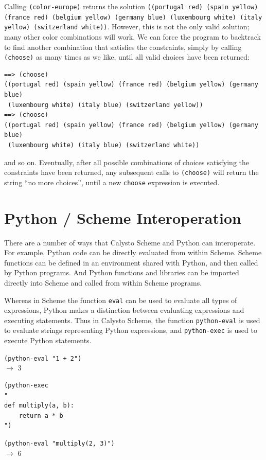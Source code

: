 \documentclass[acmsmall,screen,anonymous,review]{acmart}
\begin{document}
\noindent
Calling \texttt{(color-europe)} returns the solution \texttt{((portugal red)
(spain yellow) (france red) (belgium yellow) (germany blue) (luxembourg
white) (italy yellow) (switzerland white))}. However, this is not the only
valid solution; many other color combinations will work.  We can force the
program to backtrack to find another combination that satisfies the
constraints, simply by calling \texttt{(choose)} as many times as we like,
until all valid choices have been returned:

{\small
\begin{verbatim}
==> (choose)
((portugal red) (spain yellow) (france red) (belgium yellow) (germany blue)
 (luxembourg white) (italy blue) (switzerland yellow))
==> (choose)
((portugal red) (spain yellow) (france red) (belgium yellow) (germany blue)
 (luxembourg white) (italy blue) (switzerland white))
\end{verbatim}
}

\noindent
and so on.  Eventually, after all possible combinations of choices satisfying
the constraints have been returned, any subsequent calls to \texttt{(choose)}
will return the string ``no more choices'', until a new \texttt{choose}
expression is executed.

\section{Python / Scheme Interoperation}

There are a number of ways that Calysto Scheme and Python can interoperate. For
example, Python code can be directly evaluated from within Scheme. Scheme
functions can be defined in an environment shared with Python, and then called
by Python programs. And Python functions and libraries can be imported directly
into Scheme and called from within Scheme programs.

Whereas in Scheme the function \texttt{eval} can be used to evaluate all types
of expressions, Python makes a distinction between evaluating expressions and
executing statements. Thus in Calysto Scheme, the function \texttt{python-eval} is
used to evaluate strings representing Python expressions, and
\texttt{python-exec} is used to execute Python statements.\\

{\small
\noindent
\texttt{(python-eval "1 + 2")}\\
$\rightarrow$ 3

\noindent
\begin{verbatim}
(python-exec
"
def multiply(a, b):
    return a * b
")
\end{verbatim}
\noindent\texttt{(python-eval "multiply(2, 3)")}\\
$\rightarrow$ 6\\
}
\end{document}

